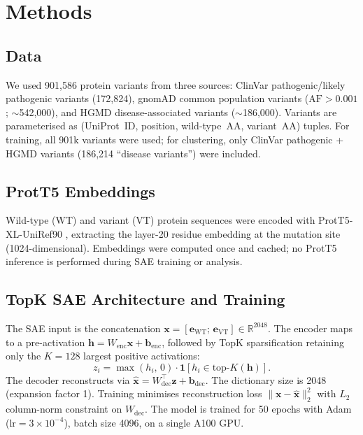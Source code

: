 \documentclass[10pt]{article}
\begin{document}
\section{Methods}

\subsection{Data}

We used 901,586 protein variants from three sources: ClinVar pathogenic/likely pathogenic
variants (172,824), gnomAD common population variants ($\text{AF} > 0.001$; $\sim$542,000),
and HGMD disease-associated variants ($\sim$186,000). Variants are parameterised as
(UniProt~ID, position, wild-type~AA, variant~AA) tuples. For training, all 901k variants
were used; for clustering, only ClinVar pathogenic + HGMD variants (186,214 ``disease
variants'') were included.

\subsection{ProtT5 Embeddings}

Wild-type (WT) and variant (VT) protein sequences were encoded with ProtT5-XL-UniRef90
\citep{elnaggar2021prottrans}, extracting the layer-20 residue embedding at the mutation
site (1024-dimensional). Embeddings were computed once and cached; no ProtT5 inference is
performed during SAE training or analysis.

\subsection{TopK SAE Architecture and Training}

The SAE input is the concatenation $\mathbf{x} = [\mathbf{e}_\text{WT};\, \mathbf{e}_\text{VT}]
\in \mathbb{R}^{2048}$. The encoder maps to a pre-activation $\mathbf{h} = W_\text{enc}\mathbf{x}
+ \mathbf{b}_\text{enc}$, followed by TopK sparsification retaining only the $K=128$ largest
positive activations:
\[
  z_i = \max(h_i,\,0)\cdot\mathbf{1}[h_i \in \text{top-}K(\mathbf{h})].
\]
The decoder reconstructs via $\hat{\mathbf{x}} = W_\text{dec}^\top \mathbf{z} + \mathbf{b}_\text{dec}$.
The dictionary size is 2048 (expansion factor 1). Training minimises reconstruction loss
$\|\mathbf{x} - \hat{\mathbf{x}}\|_2^2$ with $L_2$ column-norm constraint on $W_\text{dec}$.
The model is trained for 50 epochs with Adam ($\text{lr} = 3 \times 10^{-4}$), batch size
4096, on a single A100 GPU.
\end{document}
